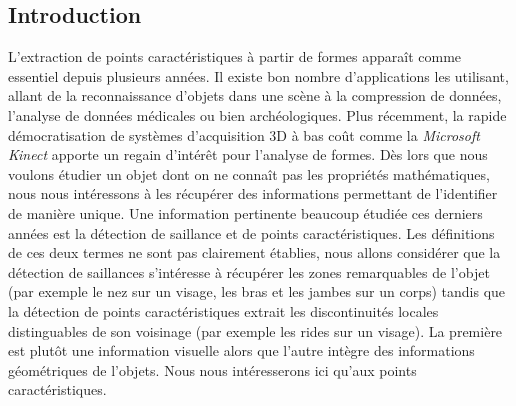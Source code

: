 \subsection{Introduction}
%
L'extraction de points caractéristiques à partir de formes apparaît comme
essentiel depuis plusieurs années. Il existe bon nombre d'applications les
utilisant, allant de la reconnaissance d'objets dans une scène à la compression
de données, l'analyse de données médicales ou bien archéologiques. Plus
récemment, la rapide démocratisation de systèmes d'acquisition 3D à bas coût
comme la \emph{Microsoft Kinect} apporte un regain d'intérêt pour l'analyse de
formes.%
%
%
Dès lors que nous voulons étudier un objet dont on ne connaît pas les propriétés
mathématiques, nous nous intéressons à les récupérer des informations permettant
de l'identifier de manière unique. Une information pertinente beaucoup étudiée
ces derniers années est la détection de saillance et de points caractéristiques.
Les définitions de ces deux termes ne sont pas clairement établies, nous allons
considérer que la détection de saillances s'intéresse à récupérer les zones
remarquables de l'objet (par exemple le nez sur un visage, les bras et les
jambes sur un corps) tandis que la détection de points caractéristiques extrait
les discontinuités locales distinguables de son voisinage (par exemple les rides
sur un visage). La première est plutôt une information visuelle alors que
l'autre intègre des informations géométriques de l'objets. Nous nous
intéresserons ici qu'aux points caractéristiques.
%
%
